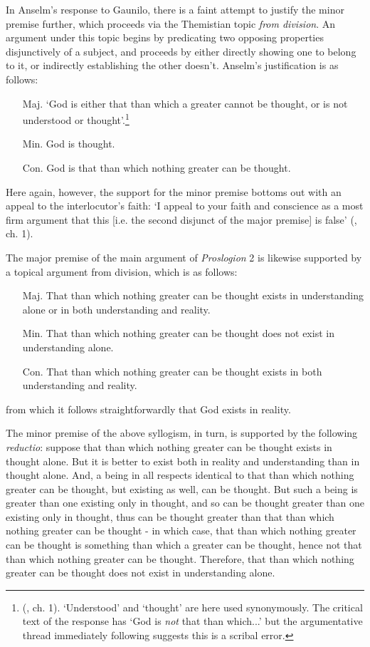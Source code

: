 \documentclass[]{birkjour}
\begin{document}
In Anselm's response to Gaunilo, there is a faint attempt to justify the minor premise further, which proceeds via the Themistian topic \textit{from division}. An argument under this topic begins by predicating two opposing properties disjunctively of a subject, and proceeds by either directly showing one to belong to it, or indirectly establishing the other doesn't. Anselm's justification is as follows:
	
\begin{enumerate}
\item[Maj.] `God is either that than which a greater cannot be thought, or is not understood or thought'.\footnote{(\cite{AnselmResp}, ch. 1). `Understood' and `thought' are here used synonymously. The critical text of the response has `God is \textit{not} that than which...' but the argumentative thread immediately following suggests this is a scribal error.}
\item[Min.] God is thought.
\item[Con.] God is that than which nothing greater can be thought.
\end{enumerate}
Here again, however, the support for the minor premise bottoms out with an appeal to the interlocutor's faith: `I appeal to your faith and conscience as a most firm argument that this [i.e. the second disjunct of the major premise] is false' (\cite{AnselmResp}, ch. 1).
	
The major premise of the main argument of \textit{Proslogion} 2 is likewise supported by a topical argument from division, which is as follows:
	
\begin{itemize}
\item[Maj.] That than which nothing greater can be thought exists in understanding alone or in both understanding and reality.
\item[Min.] That than which nothing greater can be thought does not exist in understanding alone.
\item[Con.] That than which nothing greater can be thought exists in both understanding and reality.
\end{itemize}
from which it follows straightforwardly that God exists in reality. 
	
The minor premise of the above syllogism, in turn, is supported by the following \textit{reductio}: suppose that than which nothing greater can be thought exists in thought alone. But it is better to exist both in reality and understanding than in thought alone. And, a being in all respects identical to that than which nothing greater can be thought, but existing as well, can be thought. But such a being is greater than one existing only in thought, and so can be thought greater than one existing only in thought, thus can be thought greater than that than which nothing greater can be thought - in which case, that than which nothing greater can be thought is something than which a greater can be thought, hence not that than which nothing greater can be thought. Therefore, that than which nothing greater can be thought does not exist in understanding alone.
	
\end{document}
